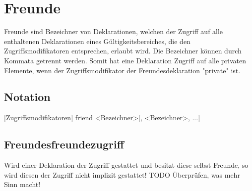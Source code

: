 \chapter{Freunde}
Freunde sind Bezeichner von Deklarationen, welchen der Zugriff auf alle enthaltenen Deklarationen eines Gültigkeitsbereiches,
die den Zugriffsmodifikatoren entsprechen, erlaubt wird.
Die Bezeichner können durch Kommata getrennt werden.
Somit hat eine Deklaration Zugriff auf alle privaten Elemente, wenn der Zugriffsmodifikator der Freundesdeklaration "private" ist.

\section{Notation}
[Zugriffsmodifikatoren] friend <Bezeichner>[, <Bezeichner>, ...]

\section{Freundesfreundezugriff}
Wird einer Deklaration der Zugriff gestattet und besitzt diese selbst Freunde, so wird diesen der Zugriff nicht implizit gestattet!
TODO Überprüfen, was mehr Sinn macht!